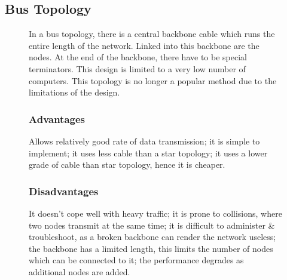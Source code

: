 \subsection*{Bus Topology}
\begin{figure}[H]
    \begin{minipage}[H]{0.6\textwidth}
        In a bus topology, there is a central backbone cable which runs the entire length of the network. Linked into this backbone are the nodes. At the end of the backbone, there have to be special terminators. This design is limited to a very low number of computers. This topology is no longer a popular method due to the limitations of the design.
        \subsubsection*{Advantages}
        Allows relatively good rate of data transmission; it is simple to implement; it uses less cable than a star topology; it uses a lower grade of cable than star topology, hence it is cheaper.
        \subsubsection*{Disadvantages}
        It doesn't cope well with heavy traffic; it is prone to collisions, where two nodes transmit at the same time; it is difficult to administer \& troubleshoot, as a broken backbone can render the network useless; the backbone has a limited length, this limits the number of nodes which can be connected to it; the performance degrades as additional nodes are added.
    \end{minipage}\hfill
    \begin{minipage}[H]{0.35\textwidth}
        \centering
    \end{minipage}\hfill
\end{figure}
